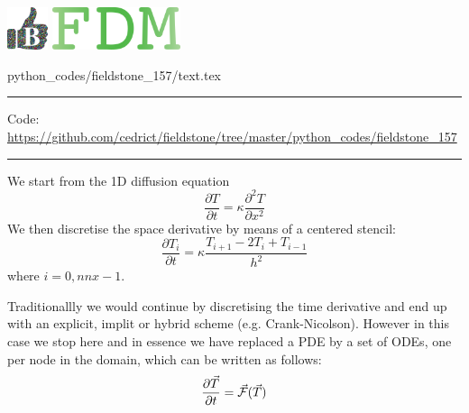 \noindent
\includegraphics[height=1.25cm]{images/pictograms/benchmark}
\includegraphics[height=1.25cm]{images/pictograms/FDM}


\begin{flushright} {\tiny {\color{gray} python\_codes/fieldstone\_157/text.tex}} \end{flushright}

%

\par\noindent\rule{\textwidth}{0.4pt}

\begin{center}
\inpython
{\small Code: \url{https://github.com/cedrict/fieldstone/tree/master/python_codes/fieldstone_157}}
\end{center}

\par\noindent\rule{\textwidth}{0.4pt}




We start from the 1D diffusion equation
\[
\frac{\partial T}{\partial t} = \kappa \frac{\partial^2 T}{\partial x^2}
\]
We then discretise the space derivative by means of a centered stencil:
\[
\frac{\partial T_i}{\partial t} = \kappa \frac{T_{i+1}-2T_i+T_{i-1}}{h^2}
\]
where $i=0,nnx-1$.

Traditionallly we would continue by discretising the time derivative and 
end up with an explicit, implit or hybrid scheme (e.g. Crank-Nicolson). 
However in this case we stop here and in essence we have replaced a PDE by 
a set of ODEs, one per node in the domain,
which can be written as follows:
\[
\frac{\partial \vec{T}}{\partial t} = \vec{\cal F}(\vec{T}) 
\] 

